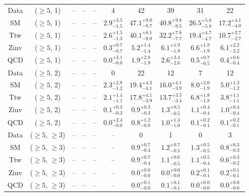 \begin{table}[h!]
{\begin{tabular}{cccccccccc}
	Data & ($\ge5$, 1) & -- & -- & -- & 4 & 42 & 39 & 31 & 22 \\[0.5ex] 
	SM & ($\ge5$, 1) & -- & -- & -- & $2.9^{+ 3.5 }_{- 1.5 }$ & $47.1^{+ 9.0 }_{- 8.7 }$ & $40.8^{+ 9.8 }_{- 9.5 }$ & $26.5^{+ 5.8 }_{- 5.8 }$ & $17.2^{+ 4.1 }_{- 4.0 }$ \\[0.5ex] 
	Ttw & ($\ge5$, 1) & -- & -- & -- & $2.6^{+ 1.5 }_{- 1.3 }$ & $40.1^{+ 8.1 }_{- 8.0 }$ & $32.2^{+ 7.8 }_{- 7.7 }$ & $19.4^{+ 4.7 }_{- 4.7 }$ & $10.7^{+ 2.7 }_{- 2.7 }$ \\[0.5ex] 
	Zinv & ($\ge5$, 1) & -- & -- & -- & $0.3^{+ 0.7 }_{- 0.7 }$ & $5.2^{+ 1.4 }_{- 1.4 }$ & $6.1^{+ 1.9 }_{- 1.9 }$ & $6.6^{+ 1.9 }_{- 1.9 }$ & $6.1^{+ 2.2 }_{- 2.2 }$ \\[0.5ex] 
	QCD & ($\ge5$, 1) & -- & -- & -- & $0.0^{+ 3.1 }_{- 0.0 }$ & $1.9^{+ 2.8 }_{- 1.9 }$ & $2.6^{+ 3.4 }_{- 2.6 }$ & $0.5^{+ 0.7 }_{- 0.5 }$ & $0.4^{+ 0.6 }_{- 0.4 }$ \\[0.5ex] 
	Data & ($\ge5$, 2) & -- & -- & -- & 0 & 22 & 12 & 7 & 12 \\[0.5ex] 
	SM & ($\ge5$, 2) & -- & -- & -- & $2.3^{+ 2.8 }_{- 1.2 }$ & $19.4^{+ 4.3 }_{- 4.1 }$ & $16.0^{+ 4.1 }_{- 3.9 }$ & $8.0^{+ 2.0 }_{- 1.9 }$ & $5.0^{+ 1.3 }_{- 1.2 }$ \\[0.5ex] 
	Ttw & ($\ge5$, 2) & -- & -- & -- & $2.1^{+ 1.4 }_{- 1.1 }$ & $17.8^{+ 4.1 }_{- 3.9 }$ & $13.7^{+ 3.5 }_{- 3.4 }$ & $6.8^{+ 1.8 }_{- 1.8 }$ & $3.8^{+ 1.1 }_{- 1.1 }$ \\[0.5ex] 
	Zinv & ($\ge5$, 2) & -- & -- & -- & $0.1^{+ 0.3 }_{- 0.3 }$ & $0.9^{+ 0.3 }_{- 0.3 }$ & $1.3^{+ 0.5 }_{- 0.5 }$ & $1.1^{+ 0.4 }_{- 0.4 }$ & $1.0^{+ 0.4 }_{- 0.4 }$ \\[0.5ex] 
	QCD & ($\ge5$, 2) & -- & -- & -- & $0.0^{+ 2.4 }_{- 0.0 }$ & $0.8^{+ 1.2 }_{- 0.8 }$ & $1.0^{+ 1.3 }_{- 1.0 }$ & $0.1^{+ 0.2 }_{- 0.1 }$ & $0.1^{+ 0.2 }_{- 0.1 }$ \\[0.5ex] 
	Data & ($\ge5$, $\ge3$) & -- & -- & -- & -- & 0 & 1 & 0 & 3 \\[0.5ex] 
	SM & ($\ge5$, $\ge3$) & -- & -- & -- & -- & $0.9^{+ 0.7 }_{- 0.4 }$ & $1.2^{+ 0.7 }_{- 0.5 }$ & $1.3^{+ 0.5 }_{- 0.5 }$ & $0.8^{+ 0.3 }_{- 0.3 }$ \\[0.5ex] 
	Ttw & ($\ge5$, $\ge3$) & -- & -- & -- & -- & $0.9^{+ 0.7 }_{- 0.4 }$ & $1.1^{+ 0.6 }_{- 0.5 }$ & $1.1^{+ 0.5 }_{- 0.4 }$ & $0.6^{+ 0.3 }_{- 0.2 }$ \\[0.5ex] 
	Zinv & ($\ge5$, $\ge3$) & -- & -- & -- & -- & $0.0^{+ 0.0 }_{- 0.0 }$ & $0.0^{+ 0.0 }_{- 0.0 }$ & $0.2^{+ 0.1 }_{- 0.1 }$ & $0.2^{+ 0.1 }_{- 0.1 }$ \\[0.5ex] 
	QCD & ($\ge5$, $\ge3$) & -- & -- & -- & -- & $0.0^{+ 0.1 }_{- 0.0 }$ & $0.1^{+ 0.1 }_{- 0.1 }$ & $0.0^{+ 0.0 }_{- 0.0 }$ & $0.0^{+ 0.0 }_{- 0.0 }$ \\[0.5ex] 
	\hline
	\hline
\end{tabular}}
\end{table}
